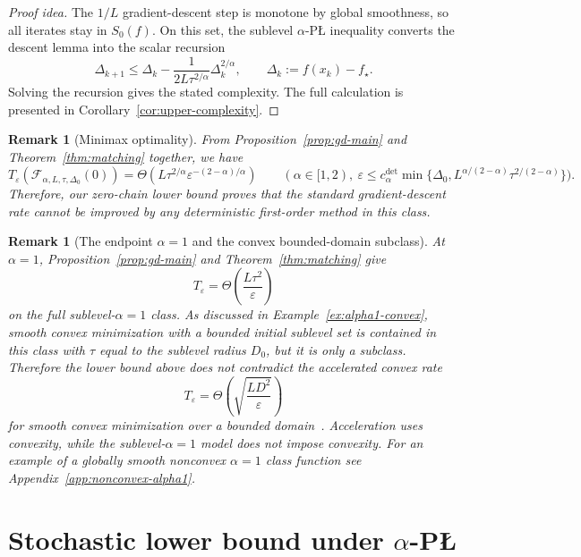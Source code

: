 \documentclass[11pt]{article}
\newtheorem{remark}[theorem]{Remark}
\begin{document}
\begin{proof}[Proof idea]
The \(1/L\) gradient-descent step is monotone by global smoothness, so all iterates stay in \(S_0(f)\). On this set,
the sublevel \(\alpha\)-P\L{} inequality converts the descent lemma into the scalar recursion
\[
\Delta_{k+1}
\le
\Delta_k-\frac{1}{2L\tau^{2/\alpha}}\Delta_k^{2/\alpha},
\qquad
\Delta_k:=f(x_k)-f_\star.
\]
Solving the recursion gives the stated complexity. The full calculation is presented in
Corollary~\ref{cor:upper-complexity}.
\end{proof}

\begin{remark}[Minimax optimality]
From Proposition~\ref{prop:gd-main} and Theorem~\ref{thm:matching} together, we have
\[
T_\varepsilon\!\left(\mathcal F_{\alpha,L,\tau,\Delta_0}(0)\right)
=
\Theta\left(L\tau^{2/\alpha}\varepsilon^{-(2-\alpha)/\alpha}\right)
\qquad
(\alpha\in[1,2),\ \varepsilon\le c_\alpha^{\mathrm{det}}\min\{\Delta_0,L^{\alpha/(2-\alpha)}\tau^{2/(2-\alpha)}\}).
\]
Therefore, our zero-chain lower bound proves that the standard gradient-descent rate cannot be improved by any
deterministic first-order method in this class.
\end{remark}

\begin{remark}[The endpoint $\alpha=1$ and the convex bounded-domain subclass]
\label{rem:alpha1-convex}
At $\alpha=1$, Proposition~\ref{prop:gd-main} and Theorem~\ref{thm:matching} give
\[
T_\varepsilon=\Theta\!\left(\frac{L\tau^2}{\varepsilon}\right)
\]
on the full sublevel-\(\alpha=1\) class. As discussed in Example~\ref{ex:alpha1-convex}, smooth convex minimization
with a bounded initial sublevel set is contained in this class with \(\tau\) equal to the sublevel radius \(D_0\), but
it is only a subclass. Therefore the lower bound above does not contradict the accelerated convex rate
\[
T_\varepsilon=\Theta\!\left(\sqrt{\frac{LD^2}{\varepsilon}}\right)
\]
for smooth convex minimization over a bounded domain~\citep{Nesterov2004}. Acceleration uses convexity, while the
sublevel-\(\alpha=1\) model does not impose convexity. For an example of a globally
smooth nonconvex  \(\alpha=1\) class function see Appendix~\ref{app:nonconvex-alpha1}.
\end{remark}

\section{\texorpdfstring{Stochastic lower bound under $\alpha$-P\L{}}{Stochastic lower bound under alpha-PL}}
\label{sec:sto}
\end{document}
